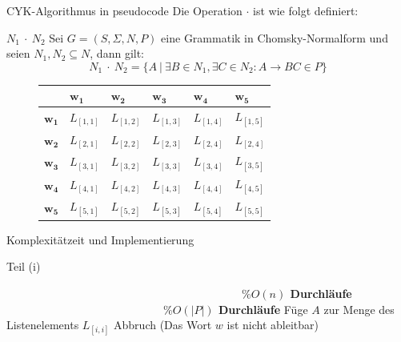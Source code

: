\documentclass{beamer}
\begin{document}
	\begin{frame}{CYK-Algorithmus in pseudocode}
		Die Operation $\cdot$ ist wie folgt definiert:
		\begin{block}{\textbf{$N_1 \ \cdot \ N_2$}}
			Sei $G = (S, \Sigma, N, P)$ eine Grammatik in Chomsky-Normalform und seien $N_1,N_2 \subseteq N$, dann gilt:
			$$N_1 \ \cdot \ N_2 = \{A \ |\ \exists  B\in N_1 , \exists C\in N_2 : A\to BC \in P\}$$
		\end{block}
		\pause
		\begin{figure}[H]
			\begin{table}[H]
				\centering
				\begin{tabular}{|m{1cm}||m{1cm}|m{1cm}|m{1cm}|m{1cm}|m{1cm}|} 
					\hline
					& $\mathbf{w_1}$ & $\mathbf{w_2}$ & $\mathbf{w_3}$ & $\mathbf{w_4}$ & $\mathbf{w_5}$  \\
					\hline\hline
					$\mathbf{w_1}$ & \cellcolor{brown} $L_{[1,1]}$ &  \cellcolor{gray}$L_{[1,2]}$ &  \cellcolor{green} $L_{[1,3]}$&  \cellcolor{blue} $L_{[1,4]}$& \cellcolor{red} $L_{[1,5]}$ \\
					\hline
					$\mathbf{w_2}$ &  $L_{[2,1]}$& \cellcolor{brown} $L_{[2,2]}$ &  \cellcolor{gray} $L_{[2,3]}$&  \cellcolor{green} $L_{[2,4]}$& \cellcolor{blue} $L_{[2,4]}$\\
					\hline
					$\mathbf{w_3}$ &  $L_{[3,1]}$&  $L_{[3,2]}$& \cellcolor{brown} $L_{[3,3]}$&  \cellcolor{gray} $L_{[3,4]}$& \cellcolor{green} $L_{[3,5]}$\\
					\hline
					$\mathbf{w_4}$ &  $L_{[4,1]}$&  $L_{[4,2]}$&  $L_{[4,3]}$& \cellcolor{brown} $L_{[4,4]}$& \cellcolor{gray} $L_{[4,5]}$\\
					\hline
					$\mathbf{w_5}$ &  $L_{[5,1]}$&  $L_{[5,2]}$&  $L_{[5,3]}$&  $L_{[5,4]}$& \cellcolor{brown} $L_{[5,5]}$\\
					\hline
				\end{tabular}
			\end{table}
		\end{figure}
	\end{frame}

	\begin{frame}{Komplexitätzeit und Implementierung}
		\begin{algorithm}[H]
			\caption[Teil (i)]{Teil (i)}
			\label{algorithm9}
			\begin{algorithmic}[1]
				  \ \ \ \ \ \ \ \ \ \ \ \ \ \ \ \ \ \ \ \ \ \ \ \ \ \ \ \ \ \ \ \ \ \ \ \ \ \ \ \ \ \ \textbf{$ \%O(n)$ Durchläufe}
				 \ \ \ \ \ \ \ \ \ \ \ \ \ \ \ \ \ \ \ \ \ \ \ \ \ \ \ \ \textbf{$\%O(|P|)$ Durchläufe}
				\State Füge $A$ zur Menge des Listenelements $L_{[i,i]}$
				\Else
				\State Abbruch (Das Wort $w$ ist nicht ableitbar)
				\EndIf
				\EndFor
				\EndFor
			\end{algorithmic}
		\end{algorithm}
	\end{frame}
\end{document}
